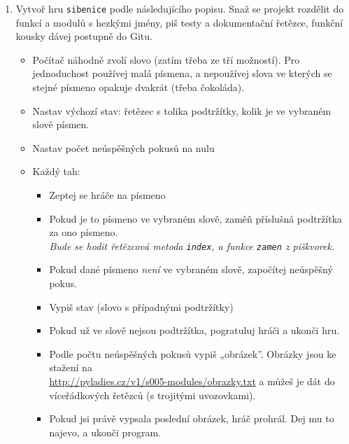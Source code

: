 \documentclass[a4paper,10pt]{article}
\begin{document}
\begin{enumerate}[resume]

\item Vytvoř hru \texttt{sibenice} podle následujícího popisu.
    Snaž se projekt rozdělit do funkcí a modulů s hezkými jmény,
    piš testy a dokumentační řetězce, funkční kousky dávej postupně do Gitu.

    \begin{itemize}
        \item Počítač náhodně zvolí slovo (zatím třeba ze tří možností).
            Pro jednoduchost používej malá písmena, a nepoužívej slova
            ve kterých se stejné písmeno opakuje dvakrát
            (třeba č\textcolor{plpink}{o}k\textcolor{plpink}{o}láda).
        \item Nastav výchozí stav: řetězec s tolika podtržítky, kolik je
             ve vybraném slově písmen.
        \item Nastav počet neúspěšných pokusů na nulu
        \item Každý tah:
            \begin{itemize}
                \item Zeptej se hráče na písmeno
                \item Pokud je to písmeno ve vybraném slově, zaměň příslušná
                    podtržítka za ono písmeno.
                    \\\emph{\small Bude se hodit řetězcová metoda \texttt{index},
                    a funkce \texttt{zamen} z piškvorek.}
                \item Pokud dané písmeno \emph{není} ve vybraném slově,
                    započítej neúspěšný pokus.
                \item Vypiš stav (slovo s případnými podtržítky)
                \item Pokud už ve slově nejsou podtržítka, pogratuluj hráči
                    a ukonči hru.
                \item Podle počtu neúspěšných pokusů vypiš „obrázek”.
                    Obrázky jsou ke stažení na \\\url{http://pyladies.cz/v1/s005-modules/obrazky.txt}
                    a můžeš je dát do víceřádkových řetězců (s trojitými uvozovkami).
                \item Pokud jsi právě vypsala poslední obrázek, hráč prohrál.
                    Dej mu to najevo, a ukonči program.
            \end{itemize}
    \end{itemize}


\end{enumerate}
\end{document}
